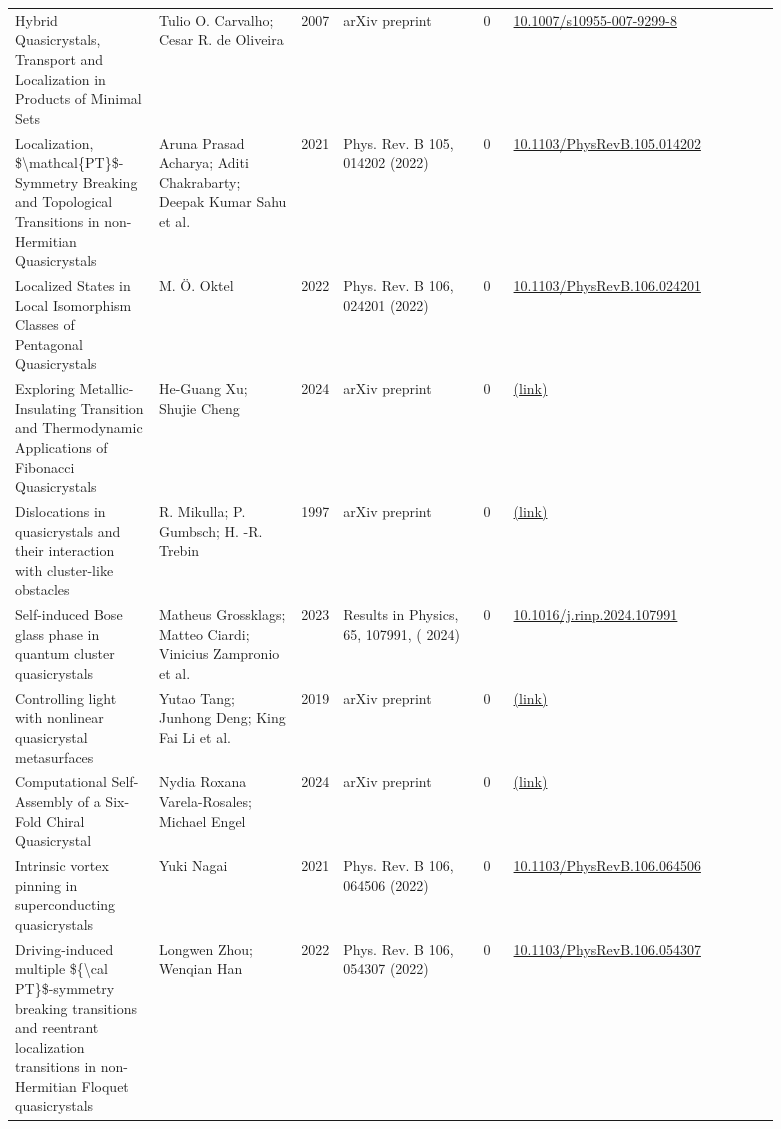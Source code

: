 \documentclass[10pt,a4paper]{article}
\begin{document}
{\begin{longtable}{p{0.192\linewidth}p{0.192\linewidth}p{0.043\linewidth}p{0.192\linewidth}p{0.043\linewidth}p{0.132\linewidth}p{0.096\linewidth}}
Hybrid Quasicrystals, Transport and Localization in Products of Minimal Sets & Tulio O. Carvalho; Cesar R. de Oliveira & 2007 & arXiv preprint & 0 & \href{https://doi.org/10.1007/s10955-007-9299-8}{10.1007/s10955-007-9299-8} &  \\
Localization, \$\textbackslash{}mathcal\{PT\}\$-Symmetry Breaking and Topological Transitions in non-Hermitian Quasicrystals & Aruna Prasad Acharya; Aditi Chakrabarty; Deepak Kumar Sahu et al. & 2021 & Phys. Rev. B 105, 014202 (2022) & 0 & \href{https://doi.org/10.1103/PhysRevB.105.014202}{10.1103/PhysRevB.105.014202} &  \\
Localized States in Local Isomorphism Classes of Pentagonal Quasicrystals & M. Ö. Oktel & 2022 & Phys. Rev. B 106, 024201 (2022) & 0 & \href{https://doi.org/10.1103/PhysRevB.106.024201}{10.1103/PhysRevB.106.024201} &  \\
Exploring Metallic-Insulating Transition and Thermodynamic Applications of Fibonacci Quasicrystals & He-Guang Xu; Shujie Cheng & 2024 & arXiv preprint & 0 & \href{http://arxiv.org/abs/2410.17550v1}{(link)} &  \\
Dislocations in quasicrystals and their interaction with cluster-like obstacles & R. Mikulla; P. Gumbsch; H. -R. Trebin & 1997 & arXiv preprint & 0 & \href{http://arxiv.org/abs/cond-mat/9708102v2}{(link)} &  \\
Self-induced Bose glass phase in quantum cluster quasicrystals & Matheus Grossklags; Matteo Ciardi; Vinicius Zampronio et al. & 2023 & Results in Physics, 65, 107991, ( 2024) & 0 & \href{https://doi.org/10.1016/j.rinp.2024.107991}{10.1016/j.rinp.2024.107991} &  \\
Controlling light with nonlinear quasicrystal metasurfaces & Yutao Tang; Junhong Deng; King Fai Li et al. & 2019 & arXiv preprint & 0 & \href{http://arxiv.org/abs/1901.10138v1}{(link)} &  \\
Computational Self-Assembly of a Six-Fold Chiral Quasicrystal & Nydia Roxana Varela-Rosales; Michael Engel & 2024 & arXiv preprint & 0 & \href{http://arxiv.org/abs/2408.01984v2}{(link)} &  \\
Intrinsic vortex pinning in superconducting quasicrystals & Yuki Nagai & 2021 & Phys. Rev. B 106, 064506 (2022) & 0 & \href{https://doi.org/10.1103/PhysRevB.106.064506}{10.1103/PhysRevB.106.064506} &  \\
Driving-induced multiple \$\{\textbackslash{}cal PT\}\$-symmetry breaking transitions and reentrant localization transitions in non-Hermitian Floquet quasicrystals & Longwen Zhou; Wenqian Han & 2022 & Phys. Rev. B 106, 054307 (2022) & 0 & \href{https://doi.org/10.1103/PhysRevB.106.054307}{10.1103/PhysRevB.106.054307} &  \\

\end{longtable}}
\end{document}
